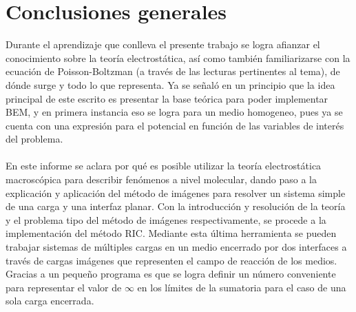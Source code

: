 \documentclass[12pt, notitlepage]{article}
\numberwithin{equation}{section}
\begin{document}





\section{Conclusiones generales}
Durante el aprendizaje que conlleva el presente trabajo se logra afianzar el conocimiento sobre la teoría electrostática, así como también familiarizarse con la ecuación de Poisson-Boltzman (a través de las lecturas pertinentes al tema), de dónde surge y todo lo que representa. Ya se señaló en un principio que la idea principal de este escrito es presentar la base teórica para poder implementar BEM, y en primera instancia eso se logra para un medio homogeneo, pues ya se cuenta con una expresión para el potencial en función de las variables de interés del problema.\\\\
En este informe se aclara por qué es posible utilizar la teoría electrostática macroscópica para describir fenómenos a nivel molecular, dando paso a la explicación y aplicación del método de imágenes para resolver un sistema simple de una carga y una interfaz planar. Con la introducción y resolución de la teoría y el problema tipo del método de imágenes respectivamente, se procede a la implementación del método RIC. Mediante esta última herramienta se pueden trabajar sistemas de múltiples cargas en un medio encerrado por dos interfaces a través de cargas imágenes que representen el campo de reacción de los medios. Gracias a un pequeño programa es que se logra definir un número conveniente para representar el valor de $\infty$ en los límites de la sumatoria para el caso de una sola carga encerrada.
\end{document}
